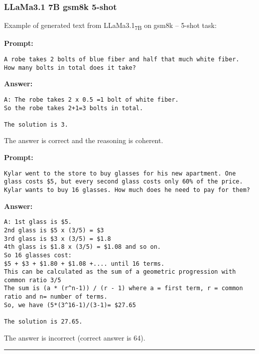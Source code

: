 \subsubsection*{LLaMa3.1 7B gsm8k 5-shot}
\noindent Example of generated text from LLaMa3.1\textsubscript{7B} on gsm8k -- 5-shot task:
\begin{displayquote}
	\textbf{Prompt:}
	\begin{Verbatim}[fontsize=\small,breaklines]
A robe takes 2 bolts of blue fiber and half that much white fiber.  How many bolts in total does it take?
	\end{Verbatim}
	\textbf{Answer:}
	\begin{Verbatim}[fontsize=\small,breaklines]
A: The robe takes 2 x 0.5 =1 bolt of white fiber.
So the robe takes 2+1=3 bolts in total.

The solution is 3.
	\end{Verbatim}
\end{displayquote}
The answer is correct and the reasoning is coherent.
\begin{displayquote}
	\textbf{Prompt:}
	\begin{Verbatim}[fontsize=\small,breaklines]
Kylar went to the store to buy glasses for his new apartment. One glass costs $5, but every second glass costs only 60% of the price. Kylar wants to buy 16 glasses. How much does he need to pay for them?
	\end{Verbatim}
	\textbf{Answer:}
	\begin{Verbatim}[fontsize=\small,breaklines]
A: 1st glass is $5.
2nd glass is $5 x (3/5) = $3
3rd glass is $3 x (3/5) = $1.8
4th glass is $1.8 x (3/5) = $1.08 and so on.
So 16 glasses cost:
$5 + $3 + $1.80 + $1.08 +.... until 16 terms.
This can be calculated as the sum of a geometric progression with common ratio 3/5
The sum is (a * (r^n-1)) / (r - 1) where a = first term, r = common ratio and n= number of terms.
So, we have (5*(3^16-1)/(3-1)= $27.65

The solution is 27.65.
	\end{Verbatim}
\end{displayquote}
The answer is incorrect (correct answer is 64).

\noindent\rule{\textwidth}{0.4pt}

